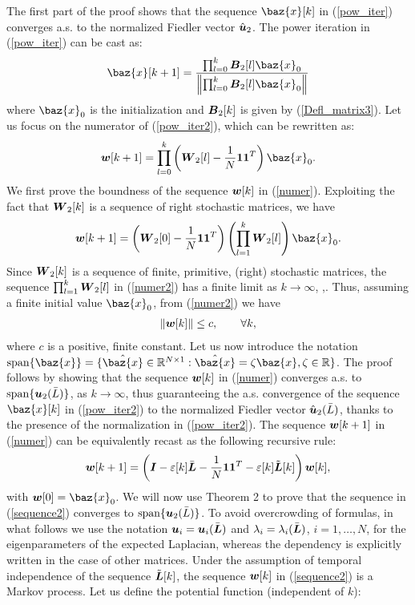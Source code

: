 \documentclass[10pt,twocolumn]{IEEEtran}
\def\bB{\mbox{\boldmath $B$}}
\def\bI{\mbox{\boldmath $I$}}
\def\bL{\mbox{\boldmath $L$}}
\def\bW{\mbox{\boldmath $W$}}
\def\bu{\mbox{\boldmath $u$}}
\def\bw{\mbox{\boldmath $w$}}
\def\bx{\baz{x}}
\begin{document}
The first part of the proof shows that the sequence $\bx[k]$ in (\ref{pow_iter}) converges a.s. to the normalized Fiedler vector $\hat{\bu}_2$. The power iteration in (\ref{pow_iter}) can be cast as:
\begin{equation}\label{pow_iter2}
   \displaystyle \bx[k+1]=\frac{\prod_{l=0}^k\bB_2[l]\bx_0}{\left\|\prod_{l=0}^k\bB_2[l]\bx_0\right\|}
\end{equation}
where $\bx_0$ is the initialization and $\bB_2[k]$ is given by (\ref{Defl_matrix3}).
Let us focus on the numerator of (\ref{pow_iter2}), which can be rewritten as:
\begin{align}\label{numer}
   \bw[k+1]=\prod_{l=0}^k\left(\bW_2[l]-\frac{1}{N}\mathbf{11}^T\right)\bx_0.
\end{align}
We first prove the boundness of the sequence $\bw[k]$ in (\ref{numer}). Exploiting the fact that $\bW_2[k]$ is a sequence of right stochastic matrices, we have
\begin{align}\label{numer2}
\bw[k+1]=\left(\bW_2[0]-\frac{1}{N}\mathbf{11}^T\right)\left(\prod_{l=1}^k\bW_2[l]\right)\bx_0.
\end{align}
Since $\bW_2[k]$ is a sequence of finite, primitive, (right) stochastic matrices, the sequence $\prod_{l=1}^k\bW_2[l]$ in (\ref{numer2}) has a finite limit as $k\rightarrow\infty$, \cite{Olfati1},\cite{Wolfowitz}. Thus, assuming a finite initial value $\bx_0$, from (\ref{numer2}) we have
\begin{align}\label{boundw}
   \|\bw[k]\|\leq c, \quad\quad \forall k,
\end{align}
where $c$ is a positive, finite constant.  Let us now introduce the notation ${\rm span}\{\bx\}=\{\hat{\bx}\in\mathbb{R}^{N\times 1}: \hat{\bx}=\zeta\bx,\zeta\in\mathbb{R}\}$. The proof follows by showing that the sequence $\bw[k]$ in (\ref{numer}) converges a.s. to ${\rm span}\{\bu_{2}(\bar{L})\}$, as $k\rightarrow\infty$, thus guaranteeing the a.s. convergence of the sequence $\bx[k]$ in (\ref{pow_iter2}) to the normalized Fiedler vector $\hat{\bu}_{2}(\bar{L})$, thanks to the presence of the normalization in (\ref{pow_iter2}). The sequence $\bw[k+1]$ in (\ref{numer}) can be equivalently recast as the following recursive rule:
\begin{align}\label{sequence2}
  \bw[k+1]=\left(\bI-\varepsilon[k]\bar{\bL}-\frac{1}{N}\mathbf{11}^T-\varepsilon[k]\tilde{\bL}[k]\right)\bw[k],
\end{align}
with $\bw[0]=\bx_0$. We will now use Theorem 2 to prove that the sequence in (\ref{sequence2}) converges to ${\rm span}\{\bu_{2}(\bar{L})\}$. To avoid overcrowding of formulas, in what follows we use the notation $\bu_i=\bu_i(\bar{\bL})$ and $\lambda_i=\lambda_i(\bar{\bL})$, $i=1,\ldots,N$, for the eigenparameters of the expected Laplacian, whereas the dependency is explicitly written in the case of other matrices. Under the assumption of temporal independence of the sequence $\tilde{\bL}[k]$, the sequence $\bw[k]$ in (\ref{sequence2}) is a Markov process. Let us define the potential function (independent of $k$):
\end{document}
